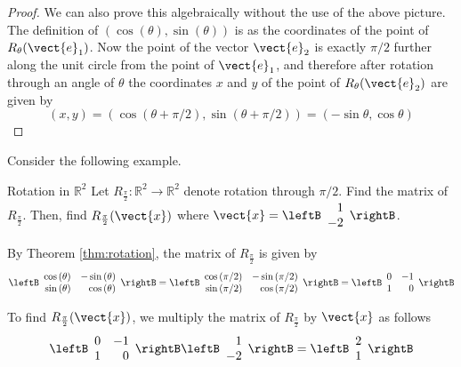 \begin{proof}
We can also prove this algebraically without the use of the
above picture. The definition of $\left(
\cos \left( \theta \right) ,\sin \left( \theta \right) \right) $ is as the 
coordinates of the point of $R_{\theta}(\vect{e}_{1})$.  Now the point of
the vector $\vect{e}_{2}$ is exactly $\pi /2$ further along the unit circle from 
the point of $\vect{e}_{1}$, and therefore after rotation through an angle of $\theta $ the coordinates
$x$ and $y$ of the point of $R_{\theta}(\vect{e}_{2})$ are given by
\begin{equation*}
\left( x,y\right) =\left( \cos \left( \theta +\pi /2\right) ,\sin \left(
\theta +\pi /2\right) \right) =\left( -\sin \theta ,\cos \theta \right) 
\end{equation*}

\end{proof}

Consider the following example. 

\begin{example}{Rotation in $\mathbb{R}^2$}\label{exa:rotation}
Let $R_{\frac{\pi}{2}}: \mathbb{R}^2 \to \mathbb{R}^2$ denote rotation through $\pi/2$. Find the matrix of $R_{\frac{\pi}{2}}$. Then, find $R_{\frac{\pi}{2}} (\vect{x})$ where $\vect{x} = \leftB
\begin{array}{r}
1 \\
-2
\end{array}
\rightB$. 
\end{example}

\begin{solution}
By Theorem \ref{thm:rotation}, the matrix of $R_{\frac{\pi}{2}}$ is given by
\[
\leftB
\begin{array}{rr}
\cos \left( \theta \right) & -\sin \left( \theta \right) \\
\sin \left( \theta \right) & \cos \left( \theta \right)
\end{array}
\rightB
=
\leftB
\begin{array}{rr}
\cos \left( \pi/2 \right) & -\sin \left( \pi/2 \right) \\
\sin \left( \pi/2 \right) & \cos \left( \pi/2 \right)
\end{array}
\rightB
=
\leftB
\begin{array}{rr}
0 & -1 \\
1 & 0 
\end{array}
\rightB
\]

To find $R_{\frac{\pi}{2}} (\vect{x})$, we multiply the matrix of $R_{\frac{\pi}{2}}$ by $\vect{x}$ as follows
\[
\leftB
\begin{array}{rr}
0 & -1 \\
1 & 0 
\end{array}
\rightB
\leftB
\begin{array}{r}
1 \\
-2 
\end{array}
\rightB
=
\leftB
\begin{array}{r}
2 \\
1
\end{array}
\rightB
\]

\end{solution}

